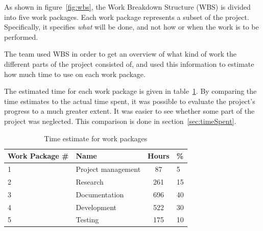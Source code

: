 As shown in figure~\ref{fig:wbs}, the Work Breakdown Structure (WBS) is divided into five work packages. Each work package represents a subset of the project. Specifically, it specifies \emph{what} will be done, and not how or when the work is to be performed.

The team used WBS in order to get an overview of what kind of work the different parts of the project consisted of, and used this information to estimate how much time to use on each work package.

The estimated time for each work package is given in table~\ref{tab:timeEstWP}. By comparing the time estimates to the actual time spent, it was possible to evaluate the project's progress to a much greater extent. It was easier to see whether some part of the project was neglected. This comparison is done in section~\ref{sec:timeSpent}.


\begin{table}[H]
\centering
{}
\begin{tabular}{|l|l|c|l|}
\hline
    \textbf{Work Package \#} & \textbf{Name} & \textbf{Hours} &\textbf{\%} \\\hline
    1 & Project management & 87&5\\\hline
    2 & Research		   & 261&15\\\hline
    3 & Documentation	   & 696&40\\\hline
    4 & Development 	   &522& 30 \\\hline
    5 & Testing  		   &175& 10\\\hline
\end{tabular}
\caption{Time estimate for work packages}
\label{tab:timeEstWP}
\end{table}
